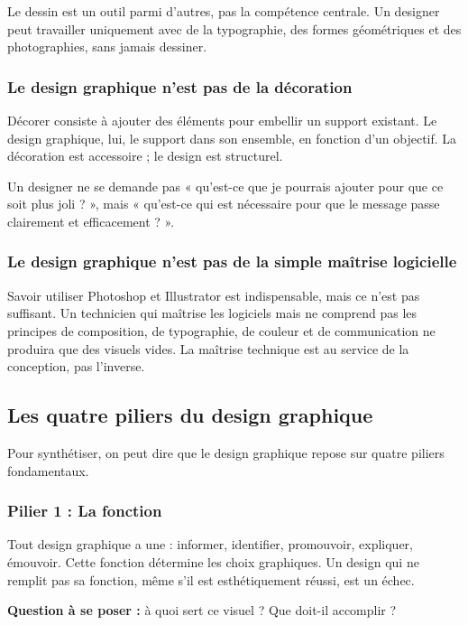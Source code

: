 Le dessin est un outil parmi d'autres, pas la compétence centrale. Un designer peut travailler uniquement avec de la typographie, des formes géométriques et des photographies, sans jamais dessiner.

\subsubsection{Le design graphique n'est pas de la décoration}

Décorer consiste à ajouter des éléments pour embellir un support existant. Le design graphique, lui,  le support dans son ensemble, en fonction d'un objectif. La décoration est accessoire ; le design est structurel.

Un designer ne se demande pas « qu'est-ce que je pourrais ajouter pour que ce soit plus joli ? », mais « qu'est-ce qui est nécessaire pour que le message passe clairement et efficacement ? ».

\subsubsection{Le design graphique n'est pas de la simple maîtrise logicielle}

Savoir utiliser Photoshop et Illustrator est indispensable, mais ce n'est pas suffisant. Un technicien qui maîtrise les logiciels mais ne comprend pas les principes de composition, de typographie, de couleur et de communication ne produira que des visuels vides. La maîtrise technique est au service de la conception, pas l'inverse.

\subsection{Les quatre piliers du design graphique}

Pour synthétiser, on peut dire que le design graphique repose sur quatre piliers fondamentaux.

\subsubsection{Pilier 1 : La fonction}

Tout design graphique a une  : informer, identifier, promouvoir, expliquer, émouvoir. Cette fonction détermine les choix graphiques. Un design qui ne remplit pas sa fonction, même s'il est esthétiquement réussi, est un échec.

\textbf{Question à se poser :} à quoi sert ce visuel ? Que doit-il accomplir ?

